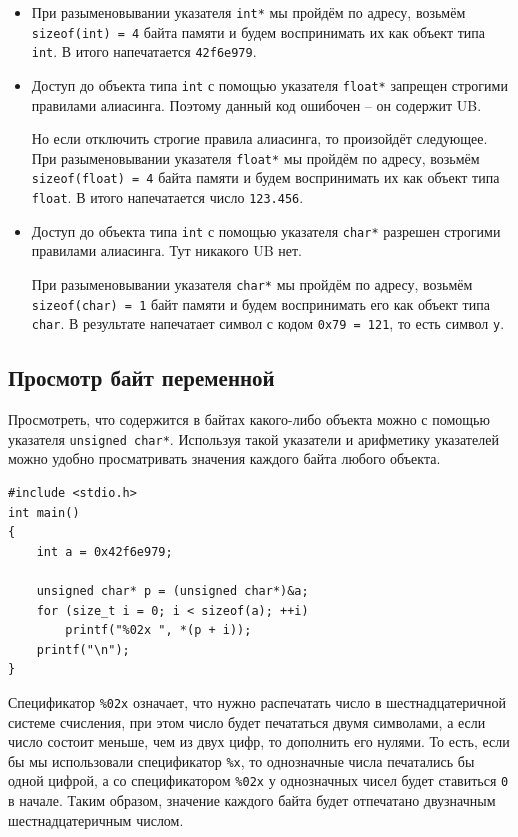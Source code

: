 \documentclass{article}
\begin{document}
\begin{itemize}
\item При разыменовывании указателя \texttt{int*} мы пройдём по адресу, возьмём \texttt{sizeof(int) = 4} байта памяти и будем воспринимать их как объект типа \texttt{int}. В итого напечатается \texttt{42f6e979}.

\item Доступ до объекта типа \texttt{int} с помощью указателя \texttt{float*} запрещен строгими правилами алиасинга. Поэтому данный код ошибочен -- он содержит UB. 

Но если отключить строгие правила алиасинга, то произойдёт следующее. При разыменовывании указателя \texttt{float*} мы пройдём по адресу, возьмём \texttt{sizeof(float) = 4} байта памяти и будем воспринимать их как объект типа \texttt{float}. В итого напечатается число \texttt{123.456}. 

\item Доступ до объекта типа \texttt{int} с помощью указателя \texttt{char*} разрешен строгими правилами алиасинга. Тут никакого UB нет.

При разыменовывании указателя \texttt{char*} мы пройдём по адресу, возьмём \texttt{sizeof(char) = 1} байт памяти и будем воспринимать его как объект типа \texttt{char}. В результате напечатает символ с кодом \texttt{0x79 = 121}, то есть символ \texttt{y}.
\end{itemize}





\subsection*{Просмотр байт переменной}
Просмотреть, что содержится в байтах какого-либо объекта можно с помощью указателя \texttt{unsigned char*}. Используя такой указатели и арифметику указателей можно удобно просматривать значения каждого байта любого объекта.

\begin{lstlisting} 
#include <stdio.h>
int main() 
{
    int a = 0x42f6e979;
    
    unsigned char* p = (unsigned char*)&a;
    for (size_t i = 0; i < sizeof(a); ++i)
        printf("%02x ", *(p + i));
    printf("\n");
}
\end{lstlisting}
Спецификатор \texttt{\%02x} означает, что нужно распечатать число в шестнадцатеричной системе счисления, при этом число будет печататься двумя символами, а если число состоит меньше, чем из двух цифр, то дополнить его нулями. То есть, если бы мы использовали спецификатор \texttt{\%x}, то однозначные числа печатались бы одной цифрой, а со спецификатором \texttt{\%02x} у однозначных чисел будет ставиться \texttt{0} в начале. Таким образом, значение каждого байта будет отпечатано двузначным шестнадцатеричным числом.
\end{document}
